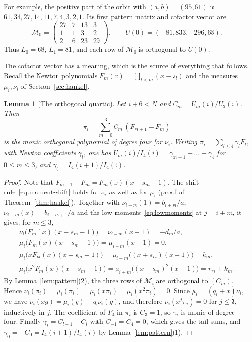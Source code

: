 \documentclass[11pt]{article}
\newtheorem{lemma}[theorem]{Lemma}
\theoremstyle{definition}
\theoremstyle{remark}
\begin{document}
For example, the positive part of the orbit with $(a,b)=(95,61)$ is
$61,34,27,14,11,7,4,3,2,1$. Its first pattern matrix and cofactor vector are
\[
 \mathcal M_0=\begin{pmatrix}27&7&13&3\\1&1&3&2\\2&6&23&29\end{pmatrix},
 \qquad U(0)=(-81,833,-296,68).
\]
Thus $L_0=68$, $L_1=81$, and each row of $\mathcal M_0$ is orthogonal
to $U(0)$.

The cofactor vector has a meaning, which is the source of everything that
follows. Recall the Newton polynomials $F_m(x)=\prod_{l<m}(x-s_l)$ and the
measures $\mu_i,\nu_i$ of Section~\ref{sec:hankel}.

\begin{lemma}[The orthogonal quartic]\label{lem:orthquartic}
Let $i+6<N$ and $C_m=U_m(i)/U_3(i)$. Then
\[
 \pi_i=\sum_{m=0}^3C_m\,(F_{m+1}-F_m)
\]
is the monic orthogonal polynomial of degree four for $\nu_i$. Writing
$\pi_i=\sum_{l\le4}\gamma_lF_l$, with \emph{Newton coefficients} $\gamma_l$, one has $U_m(i)/I_4(i)=\gamma_{m+1}+\dots+\gamma_4$
for $0\le m\le3$, and $\gamma_0=I_4(i+1)/I_4(i)$.
\end{lemma}

\begin{proof}
Note that $F_{m+1}-F_m=F_m(x)(x-s_m-1)$. The shift rule~\eqref{eq:moment-shift}
holds for $\nu_i$ as well as for $\mu_i$ (proof of Theorem~\ref{thm:hankel}).
Together with $\nu_{i+m}(1)=b_{i+m}/a$, $\nu_{i+m}(x)=b_{i+m+1}/a$ and the low
moments~\eqref{eq:lowmoments} at $j=i+m$, it gives, for $m\le3$,
\begin{gather*}
 \nu_i\bigl(F_m(x)(x-s_m-1)\bigr)=\nu_{i+m}(x-1)=-d_m/a,\\
 \mu_i\bigl(F_m(x)(x-s_m-1)\bigr)=\mu_{i+m}(x-1)=0,\\
 \mu_i\bigl(xF_m(x)(x-s_m-1)\bigr)=\mu_{i+m}\bigl((x+s_m)(x-1)\bigr)=k_m,\\
 \mu_i\bigl(x^2F_m(x)(x-s_m-1)\bigr)=\mu_{i+m}\bigl((x+s_m)^2(x-1)\bigr)=r_m+k_m.
\end{gather*}
By Lemma~\ref{lem:pattern}(2), the three rows of $\mathcal M_i$ are orthogonal to
$(C_m)$. Hence $\nu_i(\pi_i)=\mu_i(\pi_i)=\mu_i(x\pi_i)=\mu_i(x^2\pi_i)=0$. Since
$\mu_i=(q_i+x)\nu_i$, we have $\nu_i(xg)=\mu_i(g)-q_i\nu_i(g)$, and therefore
$\nu_i(x^j\pi_i)=0$ for $j\le3$, inductively in $j$. The coefficient of $F_4$
in $\pi_i$ is $C_3=1$, so $\pi_i$ is monic of degree four. Finally
$\gamma_l=C_{l-1}-C_l$ with $C_{-1}=C_4=0$, which gives the tail sums, and
$\gamma_0=-C_0=I_4(i+1)/I_4(i)$ by Lemma~\ref{lem:pattern}(1).
\end{proof}
\end{document}
